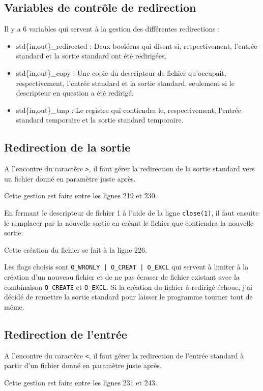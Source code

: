 \documentclass[a4paper,10pt]{article}
\begin{document}
\subsection{Variables de contrôle de redirection}
Il y a 6 variables qui servent à la gestion des différentes redirections :
\begin{itemize}
 \item std\{in,out\}\_redirected : Deux booléens qui disent si, respectivement, l'entrée standard et la sortie standard ont été redirigées.
 \item std\{in,out\}\_copy : Une copie du descripteur de fichier qu'occupait, respectivement, l'entrée standard et la sortie standard, seulement si le descripteur en question a été redirigé.
 \item std\{in,out\}\_tmp : Le registre qui contiendra le, respectivement, l'entrée standard temporaire et la sortie standard temporaire.
\end{itemize}

\subsection{Redirection de la sortie}
A l'encontre du caractère \verb?>?, il faut gérer la redirection de la sortie standard vers un fichier donné en paramètre juste après.

Cette gestion est faire entre les lignes 219 et 230.

En fermant le descripteur de fichier 1 à l'aide de la ligne \verb?close(1)?, il faut ensuite le remplacer par la nouvelle sortie en créant le fichier que contiendra la nouvelle sortie.

Cette création du fichier se fait à la ligne 226.

Les flags choisis sont \verb?O_WRONLY | O_CREAT | O_EXCL? qui servent à limiter à la création d'un nouveau fichier et de ne pas écraser de fichier existant avec la combinaison \verb?O_CREATE? et \verb?O_EXCL?. Si la création du fichier à redirigé échoue, j'ai décidé de remettre la sortie standard pour laisser le programme tourner tout de même.

\subsection{Redirection de l'entrée}
A l'encontre du caractère \verb?<?, il faut gérer la redirection de l'entrée standard à partir d'un fichier donné en paramètre juste après.

Cette gestion est faire entre les lignes 231 et 243.
\end{document}
